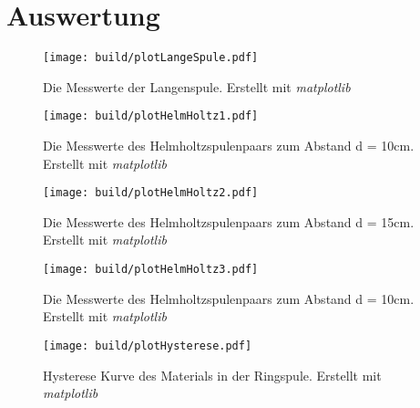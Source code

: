 \section{Auswertung}
\label{sec:Auswertung}

\begin{figure}
    \centering
    \caption{Die Messwerte der Langenspule. Erstellt mit \textit{matplotlib} \cite{matplotlib}}
    \label{fig:PlotLangeSpule}
    \texttt{[image: build/plotLangeSpule.pdf]}
\end{figure}

\begin{figure}
    \centering
    \caption{Die Messwerte des Helmholtzspulenpaars zum Abstand d = 10cm. Erstellt mit \textit{matplotlib} \cite{matplotlib}}
    \label{fig:PlotHH1}
    \texttt{[image: build/plotHelmHoltz1.pdf]}
\end{figure}

\begin{figure}
    \centering
    \caption{Die Messwerte des Helmholtzspulenpaars zum Abstand d = 15cm. Erstellt mit \textit{matplotlib} \cite{matplotlib}}
    \label{fig:PlotHH2}
    \texttt{[image: build/plotHelmHoltz2.pdf]}
\end{figure}

\begin{figure}
    \centering
    \caption{Die Messwerte des Helmholtzspulenpaars zum Abstand d = 10cm. Erstellt mit \textit{matplotlib} \cite{matplotlib}}
    \label{fig:PlotHH3}
    \texttt{[image: build/plotHelmHoltz3.pdf]}
\end{figure}

\begin{figure}
    \centering
    \caption{Hysterese Kurve des Materials in der Ringspule. Erstellt mit \textit{matplotlib} \cite{matplotlib}}
    \label{fig:PlotHysterese}
    \texttt{[image: build/plotHysterese.pdf]}
\end{figure}
